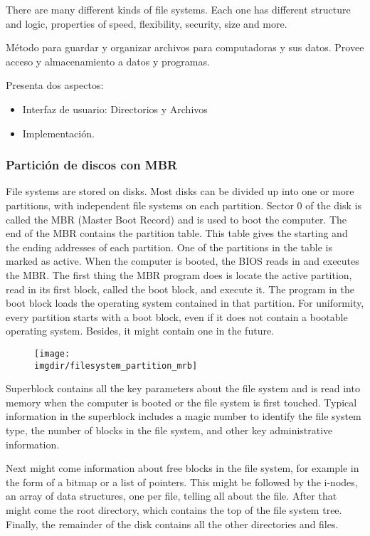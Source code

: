 \documentclass[a4paper, twoside]{article}
\newcommand{\imgdir}{../resources/images} %
\begin{document}
There are many different kinds of file systems. Each one has different structure and logic, properties of speed, flexibility, security, size and more.

Método para guardar y organizar archivos para computadoras y sus datos. Provee acceso y almacenamiento a datos y programas.

Presenta dos aspectos:
\begin{itemize}
	\item Interfaz de usuario: Directorios y Archivos
	\item Implementación.
\end{itemize}

\subsubsection{Partición de discos con MBR}
File systems are stored on disks. Most disks can be divided up into one or more partitions, with independent file systems on each partition. Sector 0 of the disk is called the MBR (Master Boot Record) and is used to boot the computer. The end of the MBR contains the partition table. This table gives the starting and the ending addresses of each partition. One of the partitions in the table is marked as active. When the computer is booted, the BIOS reads in and executes the MBR. The first thing the MBR program does is locate the active partition, read in its first block, called the boot block, and execute it. The program in the boot block loads the operating system contained in that partition. For uniformity, every partition starts with a boot block, even if it does not contain a bootable operating system. Besides, it might contain one in the future.

\begin{figure}[h]
	\centering
	\texttt{[image: \\imgdir/filesystem\_partition\_mrb]}
	\label{fig:filesystem_partition_mrb}
\end{figure}

Superblock contains all the key parameters about the file system and is read into memory when the computer is booted or the file system is first touched. Typical information in the superblock includes a magic number to identify the file system type, the number of blocks in the file system, and other key administrative information.

Next might come information about free blocks in the file system, for example in the form of a bitmap or a list of pointers. This might be followed by the i-nodes, an array of data structures, one per file, telling all about the file. After that might come the root directory, which contains the top of the file system tree. Finally, the remainder of the disk contains all the other directories and files.
\end{document}
